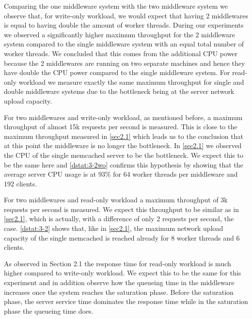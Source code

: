 \documentclass[11pt,a4paper]{article}
\begin{document}
Comparing the one middleware system with the two middleware system we observe that, for write-only workload, we would expect that having 2 middlewares is equal to having double the amount of worker threads. During our experiments we observed a significantly higher maximum throughput for the 2 middleware system compared to the single middleware system with an equal total number of worker threads. We concluded that this comes from the additional CPU power because the 2 middlewares are running on two separate machines and hence they have double the CPU power compared to the single middleware system. For read-only workload we measure exactly the same maximum throughput for single and double middleware systems due to the bottleneck being at the server network upload capacity.

For two middlewares and write-only workload, as mentioned before, a maximum throughput of almost 15k requests per second is measured. This is close to the maximum throughput measured in \autoref{sec2.1} which leads us to the conclusion that at this point the middleware is no longer the bottleneck. In \autoref{sec2.1} we observed the CPU of the single memcached server to be the bottleneck. We expect this to be the same here and \autoref{dstat:3-2wo} confirms this hypothesis by showing that the average server CPU usage is at 93\% for 64 worker threads per middleware and 192 clients.

For two middlewares and read-only workload a maximum throughput of 3k requests per second is measured. We expect this throughput to be similar as in \autoref{sec2.1}, which is actually, with a difference of only 2 requests per second, the case. \autoref{dstat:3-2} shows that, like in \autoref{sec2.1}, the maximum network upload capacity of the single memcached is reached already for 8 worker threads and 6 clients.

As observed in Section 2.1 the response time for read-only workload is much higher compared to write-only workload. We expect this to be the same for this experiment and in addition observe how the queueing time in the middleware increases once the system reaches the saturation phase. Before the saturation phase, the server service time dominates the response time while in the saturation phase the queueing time does.
\end{document}
